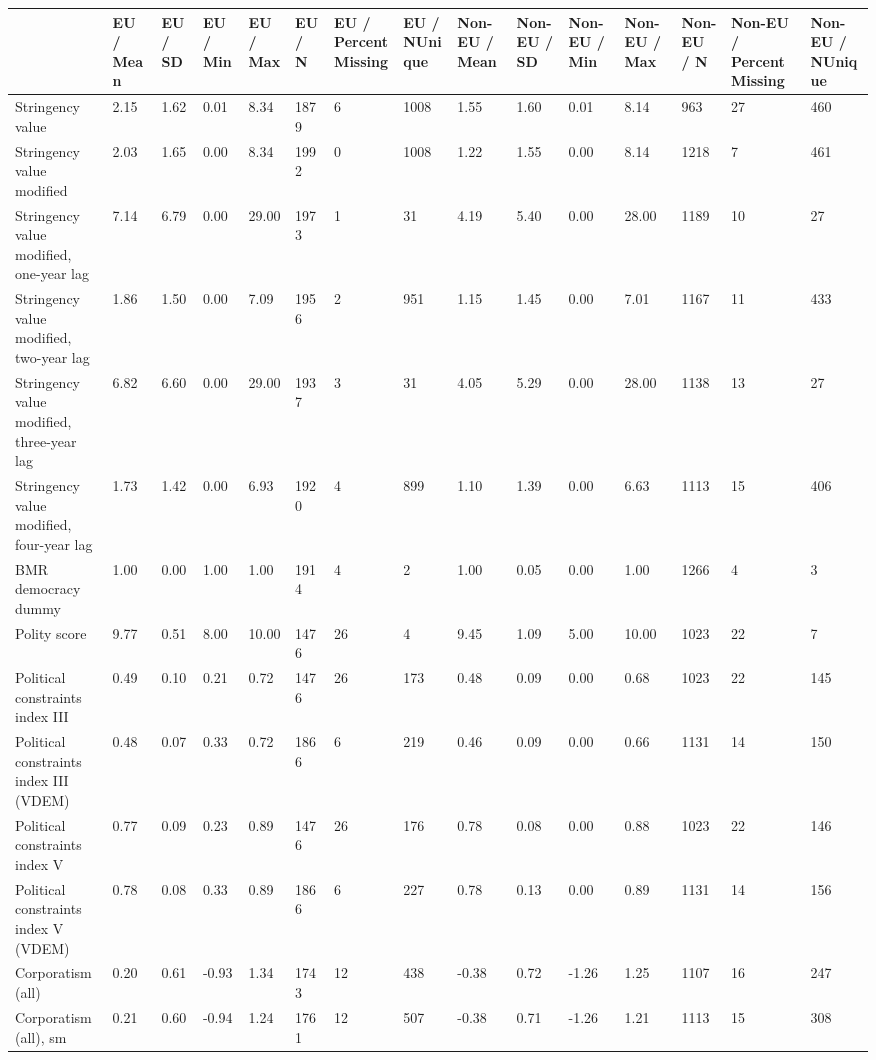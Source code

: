 
\begin{longtable}{lllllllllllllll}
\toprule
  & EU / Mean & EU / SD & EU / Min & EU / Max & EU / N & EU / PercentMissing & EU / NUnique & Non-EU / Mean & Non-EU / SD & Non-EU / Min & Non-EU / Max & Non-EU / N & Non-EU / PercentMissing & Non-EU / NUnique\\
\midrule
Stringency value & 2.15 & 1.62 & 0.01 & 8.34 & 1879 & 6 & 1008 & 1.55 & 1.60 & 0.01 & 8.14 & 963 & 27 & 460\\
Stringency value modified & 2.03 & 1.65 & 0.00 & 8.34 & 1992 & 0 & 1008 & 1.22 & 1.55 & 0.00 & 8.14 & 1218 & 7 & 461\\
Stringency value modified, one-year lag & 7.14 & 6.79 & 0.00 & 29.00 & 1973 & 1 & 31 & 4.19 & 5.40 & 0.00 & 28.00 & 1189 & 10 & 27\\
Stringency value modified, two-year lag & 1.86 & 1.50 & 0.00 & 7.09 & 1956 & 2 & 951 & 1.15 & 1.45 & 0.00 & 7.01 & 1167 & 11 & 433\\
Stringency value modified, three-year lag & 6.82 & 6.60 & 0.00 & 29.00 & 1937 & 3 & 31 & 4.05 & 5.29 & 0.00 & 28.00 & 1138 & 13 & 27\\
\addlinespace
Stringency value modified, four-year lag & 1.73 & 1.42 & 0.00 & 6.93 & 1920 & 4 & 899 & 1.10 & 1.39 & 0.00 & 6.63 & 1113 & 15 & 406\\
BMR democracy dummy & 1.00 & 0.00 & 1.00 & 1.00 & 1914 & 4 & 2 & 1.00 & 0.05 & 0.00 & 1.00 & 1266 & 4 & 3\\
Polity score & 9.77 & 0.51 & 8.00 & 10.00 & 1476 & 26 & 4 & 9.45 & 1.09 & 5.00 & 10.00 & 1023 & 22 & 7\\
Political constraints index III & 0.49 & 0.10 & 0.21 & 0.72 & 1476 & 26 & 173 & 0.48 & 0.09 & 0.00 & 0.68 & 1023 & 22 & 145\\
Political constraints index III (VDEM) & 0.48 & 0.07 & 0.33 & 0.72 & 1866 & 6 & 219 & 0.46 & 0.09 & 0.00 & 0.66 & 1131 & 14 & 150\\
\addlinespace
Political constraints index V & 0.77 & 0.09 & 0.23 & 0.89 & 1476 & 26 & 176 & 0.78 & 0.08 & 0.00 & 0.88 & 1023 & 22 & 146\\
Political constraints index V (VDEM) & 0.78 & 0.08 & 0.33 & 0.89 & 1866 & 6 & 227 & 0.78 & 0.13 & 0.00 & 0.89 & 1131 & 14 & 156\\
Corporatism (all) & 0.20 & 0.61 & -0.93 & 1.34 & 1743 & 12 & 438 & -0.38 & 0.72 & -1.26 & 1.25 & 1107 & 16 & 247\\
Corporatism (all), sm & 0.21 & 0.60 & -0.94 & 1.24 & 1761 & 12 & 507 & -0.38 & 0.71 & -1.26 & 1.21 & 1113 & 15 & 308\\

\end{longtable}
